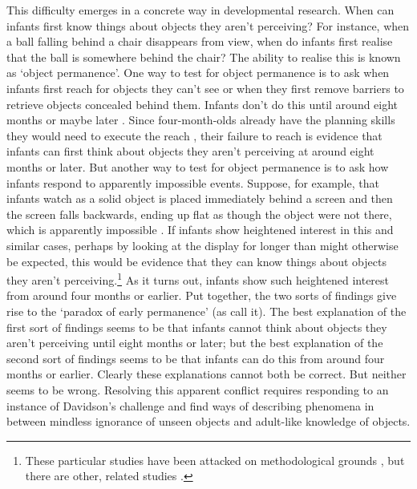 \documentclass[12pt,\papersize]{extarticle}
\begin{document}
This difficulty emerges in a concrete way in developmental research. 
When can infants first know things about objects they aren't perceiving?   
For instance, when a ball falling behind a chair disappears from view, when do infants first realise that the ball is somewhere behind the chair?
The ability to realise this is known as `object permanence'.  
One way to test for object permanence is to ask when infants first reach for objects they can’t see or when they first remove barriers to retrieve objects concealed behind them.  
Infants don’t do this until around eight months \citep[p.\ 202]{Meltzoff:1998wp} or maybe later \citep{moore:2008_factors}.  
Since four-month-olds already have the planning skills they would need to execute the reach \citep{Shinskey:2001fk}, 
their failure to reach is evidence that infants can first think about objects they aren’t perceiving at around eight months or later.  
But another way to test for object permanence is to ask how infants respond to apparently impossible events. 
Suppose, for example, that infants watch as a solid object is placed immediately behind a screen and then the screen falls backwards, ending up flat as though the object were not there, which is apparently impossible \citep{baillargeon:1985_object,baillargeon:1987_object}. 
If infants show heightened interest in this and similar cases, perhaps by looking at the display for longer than might otherwise be expected, this would be evidence that they can know things about objects they aren't perceiving.\footnote{
These particular studies have been attacked on methodological grounds \citep[e.g.][]{sirois:2007_social_}, but there are other, related studies \citep[some are mentioned by][]{Aguiar:2002ob}.
}
As it turns out, infants show such heightened interest from around four months or earlier. 
Put together, the two sorts of findings give rise to the `paradox of early permanence' (as \citealp{Meltzoff:1998wp} call it). 
The best explanation of the first sort of findings seems to be that infants cannot think about objects they aren't perceiving until eight months or later; 
but the best explanation of the second sort of findings seems to be that infants can do this from around four months or earlier. 
Clearly these explanations cannot both be correct. 
But neither seems to be wrong. 
Resolving this apparent conflict requires responding to an instance of Davidson's challenge and find ways of describing phenomena in between mindless ignorance of unseen objects and adult-like knowledge of objects.  
\end{document}
